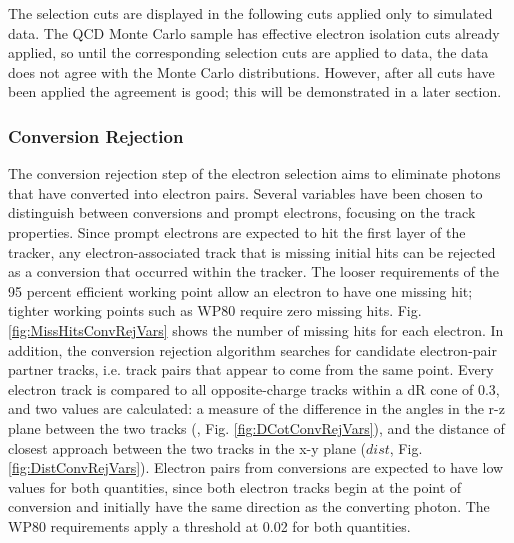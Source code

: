 The selection cuts are displayed in the following cuts applied only to simulated data.  
The QCD Monte Carlo sample has effective electron isolation cuts already applied, 
so until the corresponding selection cuts are applied to data, 
the data does not agree with the Monte Carlo distributions.  
However, after all cuts have been applied the agreement is good; 
this will be demonstrated in a later section.  


\subsubsection{Conversion Rejection}
\label{evSel:convRej}
The conversion rejection step of the electron selection aims to eliminate photons that have converted into electron pairs.  
Several variables have been chosen to distinguish between conversions and prompt electrons, focusing on the track properties.  
Since prompt electrons are expected to hit the first layer of the tracker, 
any electron-associated track that is missing initial hits can be rejected as a conversion that occurred within the tracker.  
The looser requirements of the 95 percent efficient working point allow an electron to have one missing hit;
tighter working points such as WP80 require zero missing hits.  
Fig. \ref{fig:MissHitsConvRejVars} shows the number of missing hits for each electron.  
In addition, the conversion rejection algorithm searches for candidate electron-pair partner tracks, 
i.e. track pairs that appear to come from the same point.  
Every electron track is compared to all opposite-charge tracks within a dR cone of 0.3, and two values are calculated: 
a measure of the difference in the angles in the r-z plane between the two tracks (\dCotTheta, Fig. \ref{fig:DCotConvRejVars}), 
and the distance of closest approach between the two tracks in the x-y plane ($dist$, Fig. \ref{fig:DistConvRejVars}).  
Electron pairs from conversions are expected to have low values for both quantities, 
since both electron tracks begin at the point of conversion and initially have the same direction as the converting photon.  
The WP80 requirements apply a threshold at 0.02 for both quantities.  

